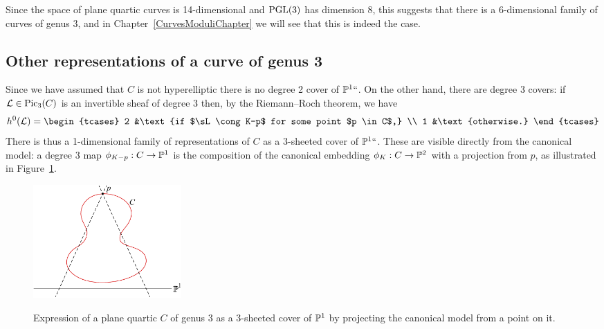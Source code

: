Since the space of plane quartic curves is 14-dimensional and
$\operatorname{PGL}(3)$ has dimension 8,
this suggests that
there is a 6-dimensional family of curves of genus 3, and in
Chapter~\ref{CurvesModuliChapter}
we will see that
this is indeed the case.

\subsection*{Other representations of a curve of genus 3}
\label{other genus 3}
Since we have assumed that $C$ is not hyperelliptic there is no degree 2
cover of ${\mathbb P}^1` `$. On the other hand, there are degree 3 covers: if ${\mathcal L} \in
\operatorname{Pic}_3(C)$ is an invertible sheaf of degree 3 then, by the
%
Riemann--Roch theorem, we have
$$
h^0(\sL) =
\begin{tcases}
2 &\text{if $\sL \cong K-p$ for some point $p \in C$,} \\
1 &\text{otherwise.}
\end{tcases}
$$
There is thus a 1-dimensional family of representations of $C$ as a
3-sheeted cover of ${\mathbb P}^1` `$. These are  visible directly from the canonical
model: a degree 3 map $\phi_{K-p} : C \to {\mathbb P}^1$ is the composition of
the canonical embedding $\phi_K : C \to {\mathbb P}^2$ with a projection from $p$,
as illustrated in Figure~\ref{g13 on quartic}.

\begin{figure}
\includegraphics[height=1.7in,trim=0 0 15 0,clip]{main/Fig05-3}%
 \caption{Expression of a plane quartic $C$ of genus 3 as a 3-sheeted
%
 cover of ${\mathbb P}^1$ by projecting the canonical model from a point on it.}
%
 \label{g13 on quartic}
\end{figure}

